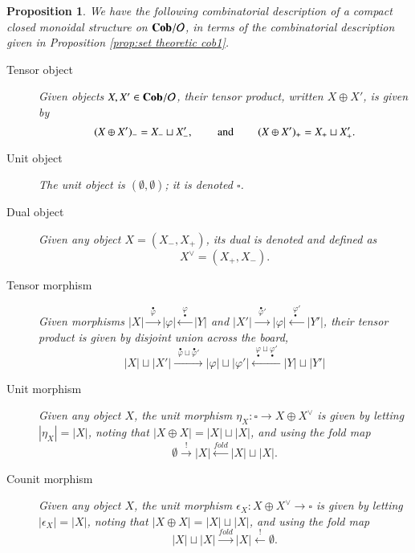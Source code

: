 \documentclass{amsart}
\def\tn{\textnormal}
\def\mc{\mathcal}
\def\hsp{\hspace{.3in}}
\def\to{\rightarrow}
\def\taking{\colon}
\newcommand{\To}[1]{\xrightarrow{#1}}
\newcommand{\Too}[1]{\xrightarrow{\ \ #1\ \ }}
\newcommand{\From}[1]{\xleftarrow{#1}}
\newcommand{\Fromm}[1]{\xleftarrow{\ \ #1\ \ }}
\def\Cob{{\bf Cob}}
\def\mcO{\mc{O}}
\newcommand{\inp}[1]{{#1_-}}
\newcommand{\outp}[1]{{#1_+}}
\newcommand{\domn}[1]{{\overset{\bullet}{#1}}}
\newcommand{\codomn}[1]{{\underset{\bullet}{#1}}}
\newtheorem{proposition}[subsubsection]{Proposition}
\theoremstyle{remark}
\theoremstyle{definition}
\begin{document}
\begin{proposition}

We have the following combinatorial description of a compact closed monoidal structure on $\Cob/\mcO$, in terms of the combinatorial description given in Proposition \ref{prop:set theoretic cob1}.
\begin{description}
\item [Tensor object] Given objects $X,X'\in\Cob/\mcO$, their tensor product, written $X\oplus X'$, is given by 
$$\inp{(X\oplus X')}=\inp{X}\sqcup\inp{X'}, \hsp\tn{and}\hsp \outp{(X\oplus X')}=\outp{X}\sqcup\outp{X'}.$$
\item [Unit object] The unit object is $(\emptyset,\emptyset)$; it is denoted $\square$.
\item [Dual object] Given any object $X=(\inp{X},\outp{X})$, its dual is denoted and defined as 
$$X^\vee=(\outp{X},\inp{X}).$$
\item [Tensor morphism] Given morphisms $|X|\Too{\domn{\varphi}}|\varphi|\Fromm{\codomn{\varphi}}|Y|$ and $|X'|\Too{\domn{\varphi}\hspace{0pt}'}|\varphi|\Fromm{\codomn{\varphi}'}|Y'|$, their tensor product is given by disjoint union across the board,
$$|X|\sqcup|X'|\Too{\domn{\varphi}\sqcup\domn{\varphi}'}|\varphi|\sqcup|\varphi'|\Fromm{\codomn{\varphi}\sqcup\codomn{\varphi}\hspace{0in}'}|Y|\sqcup|Y'|$$
\item [Unit morphism] Given any object $X$, the unit morphism $\eta_X\taking\square\to X\oplus X^\vee$ is given by letting $|\eta_X|=|X|$, noting that $|X\oplus X|=|X|\sqcup|X|$, and using the fold map 
$$\emptyset\To{!}|X|\From{fold}|X|\sqcup|X|.$$
\item [Counit morphism] Given any object $X$, the unit morphism $\epsilon_X\taking X\oplus X^\vee\to\square$ is given by letting $|\epsilon_X|=|X|$, noting that $|X\oplus X|=|X|\sqcup|X|$, and using the fold map 
$$|X|\sqcup|X|\To{fold}|X|\From{!}\emptyset.$$

\end{description}

\end{proposition}
\end{document}

